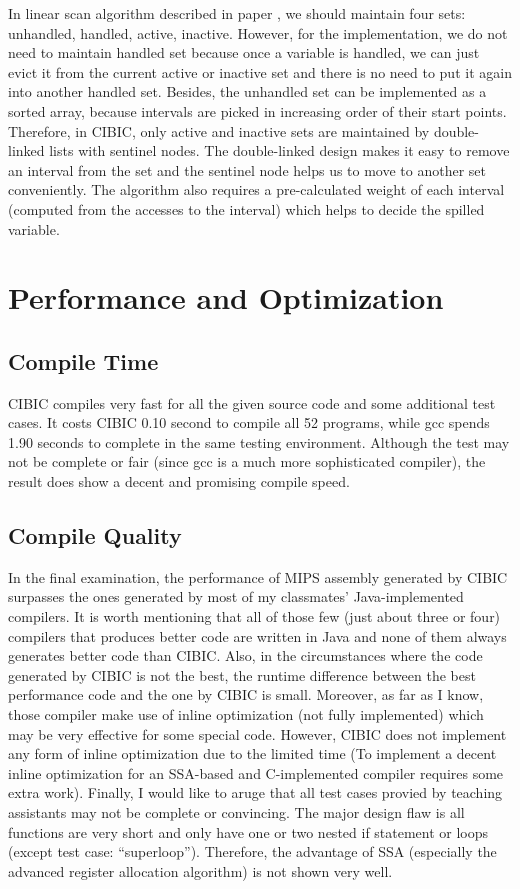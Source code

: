 \documentclass[10pt, a4paper]{article}
\begin{document}
In linear scan algorithm described in paper \cite{moe02}, we should maintain
four sets: unhandled, handled, active, inactive. However, for the
implementation, we do not need to maintain handled set because once a variable
is handled, we can just evict it from the current active or inactive set and
there is no need to put it again into another handled set. Besides, the
unhandled set can be implemented as a sorted array, because intervals are
picked in increasing order of their start points. Therefore, in CIBIC, only
active and inactive sets are maintained by double-linked lists with sentinel
nodes. The double-linked design makes it easy to remove an interval from the
set and the sentinel node helps us to move to another set conveniently. The
algorithm also requires a pre-calculated weight of each interval (computed from
the accesses to the interval) which helps to decide the spilled variable.
\section{Performance and Optimization}
\subsection{Compile Time}
CIBIC compiles very fast for all the given source code and some additional test
cases. It costs CIBIC 0.10 second to compile all 52 programs, while gcc spends
1.90 seconds to complete in the same testing environment. Although the test may
not be complete or fair (since gcc is a much more sophisticated compiler), the
result does show a decent and promising compile speed.
\subsection{Compile Quality}
In the final examination, the performance of MIPS assembly generated by CIBIC
surpasses the ones generated by most of my classmates' Java-implemented
compilers. It is worth mentioning that all of those few (just about three or
four) compilers that produces better code are written in Java and none of them
always generates better code than CIBIC. Also, in the circumstances where the
code generated by CIBIC is not the best, the runtime difference between the
best performance code and the one by CIBIC is small. Moreover, as far as I
know, those compiler make use of inline optimization (not fully implemented)
which may be very effective for some special code. However, CIBIC does not
implement any form of inline optimization due to the limited time (To implement
a decent inline optimization for an SSA-based and C-implemented compiler
requires some extra work). Finally, I would like to aruge that all test cases
provied by teaching assistants may not be complete or convincing. The major
design flaw is all functions are very short and only have one or two nested if
statement or loops (except test case: ``superloop''). Therefore, the advantage
of SSA (especially the advanced register allocation algorithm) is not shown
very well.
\end{document}
